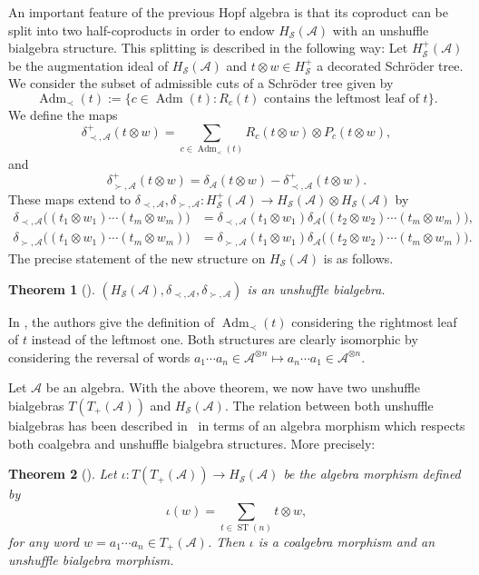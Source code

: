 \documentclass[pdftex]{sigma}%
\numberwithin{equation}{section}
\newtheorem{Theorem}{Theorem}[section]
\newcommand{\A}{\mathcal{A}}
\newcommand{\ST}{\operatorname{ST}}
\newcommand{\cHS}{H_\mathcal{S}}
\begin{document}
An important feature of the previous Hopf algebra is that its coproduct can be split into two half-coproducts in order to endow $\cHS(\A)$ with an unshuffle bialgebra structure. This splitting is described in the following way: Let $\cHS^+(\A)$ be the augmentation ideal of $\cHS(\A)$ and $t\otimes w \in \cHS^+$ a decorated Schr\"oder tree. We consider the subset of admissible cuts of a Schr\"oder tree given by
\[
	\operatorname{Adm}_\prec(t) := \{c\in \operatorname{Adm}(t)\colon \text{$R_c(t)$ contains the leftmost leaf of $t$}\}.
\]
We define the maps
\[
	\delta^+_{\prec,\A} (t\otimes w)= \sum_{c\in \operatorname{Adm}_\prec(t)} R_c(t\otimes w)\otimes P_c(t\otimes w),
\]
and
\[
	\delta_{\succ,\A}^+(t\otimes w) = \delta_\A(t\otimes w) - \delta_{\prec,\A}^+(t\otimes w).
 \]
These maps extend to $\delta_{\prec,\A},\delta_{\succ,\A} \colon \cHS^+(\A) \to \cHS(\A)\otimes \cHS(\A)$ by
\begin{align*}
	\delta_{\prec,\A}\big((t_1\otimes w_1)\cdots (t_m\otimes w_m)\big)
	&= \delta_{\prec,\A}(t_1\otimes w_1)\delta_\A\big((t_2\otimes w_2)\cdots (t_m\otimes w_m)\big),\\
	\delta_{\succ,\A}\big((t_1\otimes w_1)\cdots (t_m\otimes w_m)\big)
	&= \delta_{\succ,\A}(t_1\otimes w_1)\delta_\A\big((t_2\otimes w_2)\cdots (t_m\otimes w_m)\big).
\end{align*}
The precise statement of the new structure on $\cHS(\A)$ is as follows.

\begin{Theorem}[\cite{JMNT}]
$(\cHS(\A),\delta_{\prec,\A},\delta_{\succ,\A})$ is an unshuffle bialgebra.
\end{Theorem}

\begin{Remark}
In \cite{JMNT}, the authors give the definition of $\operatorname{Adm}_\prec(t)$ considering the rightmost leaf of $t$ instead of the leftmost one. Both structures are clearly isomorphic by considering the reversal of words $a_1\cdots a_n \in \A^{\otimes n}\mapsto a_n\cdots a_1 \in \A^{\otimes n}$.
\end{Remark}

Let $\A$ be an algebra. With the above theorem, we now have two unshuffle bialgebras $T(T_+(\A))$ and $\cHS(\A)$. The relation between both unshuffle bialgebras has been described in~\cite{JMNT} in terms of an algebra morphism which respects both coalgebra and unshuffle bialgebra structures. More precisely:

\begin{Theorem}[\cite{JMNT}]
Let $\iota\colon T(T_+(\A))\to \cHS(\A)$ be the algebra morphism defined by
\begin{equation}\label{eq:iota}
	\iota(w) = \sum_{t\in \ST(n)} t\otimes w,
\end{equation}
for any word $w= a_1\cdots a_n \in T_+(\A)$. Then $\iota$ is a coalgebra morphism and an unshuffle bialgebra morphism.
\end{Theorem}
\end{document}
